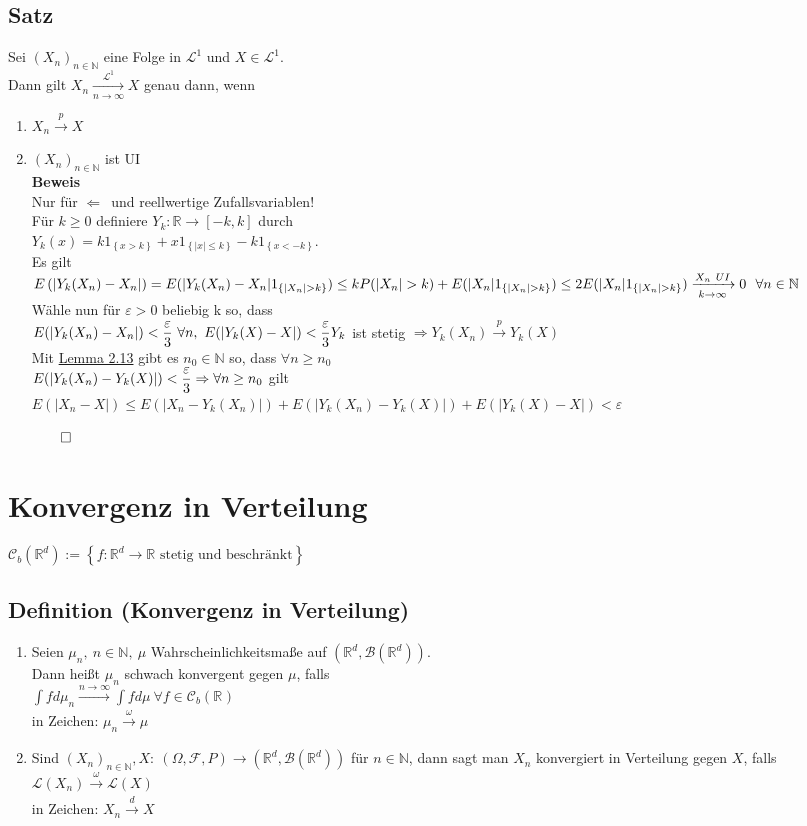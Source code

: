 \documentclass[german,10pt,oneside, fleqn, a4paper]{article}
\newcommand {\R}	{\mathbb{R}}
\newcommand {\N}	{\mathbb{N}}
\newcommand{\Ra}	{\Rightarrow}
\newcommand{\La}	{\Leftarrow}
\newcommand{\brc}[1]{\left(#1\right)}
\newcommand{\brac}[1]{\left\lbrace #1\right\rbrace}
\newcommand{\folge}[3][\N]{\left(#2_#3\right)_{#3\in #1}}
\newcommand{\QED}{\begin{flushright}$\qed$\end{flushright}}
\newcommand{\mc}[1]{\mathcal{#1}}
\newcommand{\lp}[1]{\mc{L}^{#1}}
\newcommand{\la}{\lp{1}}
\newcommand{\beweis}{\textbf{Beweis}\\}
\newcommand{\toinf}{\rightarrow\infty}
\newcommand{\fn}[1][n]{\ \forall #1\in\N}
\newcommand{\1}[1]{1_{#1}}
\newcommand{\2}[1]{\1{\brac{#1}}}
\newcommand{\xr}[2][]{\xrightarrow[#1]{#2}}
\newcommand{\cb}[1][d]{\mc{C}_b\brc{\R^{#1}}}
\newcommand{\rbor}[1][d]{\brc{\R^{#1},\mc{B}\brc{\R^{#1}}}}
\newcommand{\raum}{\brc{\Omega,\mc{F},P}}
\begin{document}
\subsection{Satz}
Sei $\folge{X}{n}$ eine Folge in $\la$ und $X\in\la$. \\
Dann gilt $X_n\xrightarrow[n\toinf]{\la}X$ genau dann, wenn
\begin{enumerate}[label=(\roman*)]
\item $X_n\xrightarrow {p}X$
\item $\folge{X}{n}$ ist UI\\
\beweis
Nur für \glqq$\La$\grqq\ und reellwertige Zufallsvariablen!\\
Für $k\geq 0$ definiere $Y_k:\R\rightarrow\left[ -k,k\right]$ durch\\ $Y_k(x)=k\1{\brac{x>k}}+x\1{\brac{|x|\leq k}}-k\1{\brac{x<-k}}$.\\
Es gilt \\
$E\brc{|Y_k(X_n)-X_n|}=E(|Y_k(X_n)-X_n|\1{\brac{|X_n|>k}})\\
\leq kP(|X_n|>k)+E(|X_n|\1{\brac{|X_n|>k}})\\
\leq 2E(|X_n|\1{\brac{|X_n|>k}})\xrightarrow[k\toinf]{X_n\ UI}0\ \fn$\\
Wähle nun für $\varepsilon>0$ beliebig k so, dass\\
$E(|Y_k(X_n)-X_n|)<\dfrac{\varepsilon}{3}\ \forall n,\ E(|Y_k(X)-X|)<\dfrac{\varepsilon}{3}\\
Y_k$ ist stetig $\Ra Y_k(X_n)\xr{p}Y_k(X)$\\
Mit \hyperref[2.13]{Lemma 2.13} gibt es $n_0\in\N$ so, dass $\forall n\geq  n_0$ \\
$E(|Y_k(X_n)-Y_k(X)|)<\dfrac{\varepsilon}{3}\\
\Ra \forall n\geq n_0$ gilt $E(|X_n-X|)\leq E(|X_n-Y_k(X_n)|)+E(|Y_k(X_n)-Y_k(X)|)+E(|Y_k(X)-X|)<\varepsilon$\QED
\end{enumerate}






\pagebreak
\section{Konvergenz in Verteilung}
$\cb:=\brac{f:\R ^d\rightarrow \R \text{ stetig und beschränkt}}$
\subsection{Definition (Konvergenz in Verteilung)}
\begin{enumerate}[label=(\alph*)]
\item Seien $\mu_n,\ n\in\N,\ \mu$ Wahrscheinlichkeitsmaße auf $\rbor$. \\
Dann heißt $\mu_n$ schwach konvergent gegen $\mu$, falls\\
$\int f d\mu_n\xr{n\toinf}\int fd\mu\ \forall f\in\cb[]$\\
in Zeichen: $\mu_n\xr{\omega}\mu$
\item Sind $\folge{X}{n}, X:\ \raum\rightarrow\rbor$ für $n\in\N$, dann sagt man $X_n$ konvergiert in Verteilung gegen $X$, falls $\mc{L}(X_n)\xr{\omega}\mc{L}(X)$\\
in Zeichen: $X_n\xr{d}X$
\end{enumerate}
\end{document}
